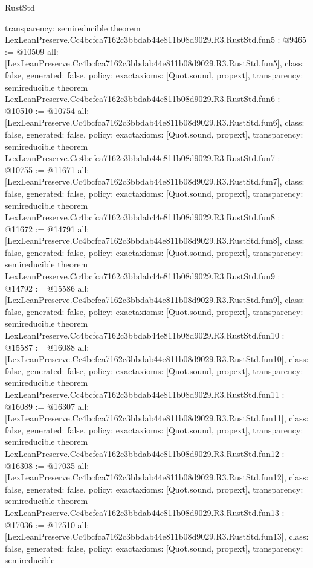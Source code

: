 \begin{lexlean}{RustStd}
\begin{coremodule}
{  transparency: semireducible
}
theorem LexLeanPreserve.Cc4bcfca7162c3bbdab44e811b08d9029.R3.RustStd.fun5 : @9465 := @10509 {
  all: [LexLeanPreserve.Cc4bcfca7162c3bbdab44e811b08d9029.R3.RustStd.fun5],
  class: false,
  generated: false,
  policy: exact{axioms: [Quot.sound, propext]},
  transparency: semireducible
}
theorem LexLeanPreserve.Cc4bcfca7162c3bbdab44e811b08d9029.R3.RustStd.fun6 : @10510 := @10754 {
  all: [LexLeanPreserve.Cc4bcfca7162c3bbdab44e811b08d9029.R3.RustStd.fun6],
  class: false,
  generated: false,
  policy: exact{axioms: [Quot.sound, propext]},
  transparency: semireducible
}
theorem LexLeanPreserve.Cc4bcfca7162c3bbdab44e811b08d9029.R3.RustStd.fun7 : @10755 := @11671 {
  all: [LexLeanPreserve.Cc4bcfca7162c3bbdab44e811b08d9029.R3.RustStd.fun7],
  class: false,
  generated: false,
  policy: exact{axioms: [Quot.sound, propext]},
  transparency: semireducible
}
theorem LexLeanPreserve.Cc4bcfca7162c3bbdab44e811b08d9029.R3.RustStd.fun8 : @11672 := @14791 {
  all: [LexLeanPreserve.Cc4bcfca7162c3bbdab44e811b08d9029.R3.RustStd.fun8],
  class: false,
  generated: false,
  policy: exact{axioms: [Quot.sound, propext]},
  transparency: semireducible
}
theorem LexLeanPreserve.Cc4bcfca7162c3bbdab44e811b08d9029.R3.RustStd.fun9 : @14792 := @15586 {
  all: [LexLeanPreserve.Cc4bcfca7162c3bbdab44e811b08d9029.R3.RustStd.fun9],
  class: false,
  generated: false,
  policy: exact{axioms: [Quot.sound, propext]},
  transparency: semireducible
}
theorem LexLeanPreserve.Cc4bcfca7162c3bbdab44e811b08d9029.R3.RustStd.fun10 : @15587 := @16088 {
  all: [LexLeanPreserve.Cc4bcfca7162c3bbdab44e811b08d9029.R3.RustStd.fun10],
  class: false,
  generated: false,
  policy: exact{axioms: [Quot.sound, propext]},
  transparency: semireducible
}
theorem LexLeanPreserve.Cc4bcfca7162c3bbdab44e811b08d9029.R3.RustStd.fun11 : @16089 := @16307 {
  all: [LexLeanPreserve.Cc4bcfca7162c3bbdab44e811b08d9029.R3.RustStd.fun11],
  class: false,
  generated: false,
  policy: exact{axioms: [Quot.sound, propext]},
  transparency: semireducible
}
theorem LexLeanPreserve.Cc4bcfca7162c3bbdab44e811b08d9029.R3.RustStd.fun12 : @16308 := @17035 {
  all: [LexLeanPreserve.Cc4bcfca7162c3bbdab44e811b08d9029.R3.RustStd.fun12],
  class: false,
  generated: false,
  policy: exact{axioms: [Quot.sound, propext]},
  transparency: semireducible
}
theorem LexLeanPreserve.Cc4bcfca7162c3bbdab44e811b08d9029.R3.RustStd.fun13 : @17036 := @17510 {
  all: [LexLeanPreserve.Cc4bcfca7162c3bbdab44e811b08d9029.R3.RustStd.fun13],
  class: false,
  generated: false,
  policy: exact{axioms: [Quot.sound, propext]},
  transparency: semireducible
}
\end{coremodule}
\end{lexlean}
